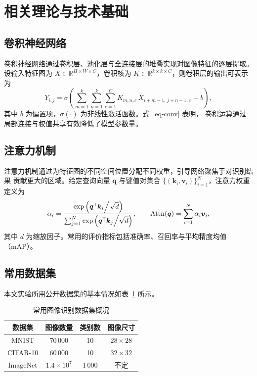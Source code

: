 \section{相关理论与技术基础}

\subsection{卷积神经网络}

\quad 卷积神经网络通过卷积层、池化层与全连接层的堆叠实现对图像特征的逐层提取。
设输入特征图为 $X \in \mathbb{R}^{H \times W \times C}$，卷积核为
$K \in \mathbb{R}^{k \times k \times C}$，则卷积层的输出可表示为
\begin{equation}
  Y_{i,j} = \sigma\left( \sum_{m=1}^{k} \sum_{n=1}^{k} \sum_{c=1}^{C}
    K_{m,n,c} \, X_{i+m-1,\,j+n-1,\,c} + b \right),
  \label{eq-conv}
\end{equation}
其中 $b$ 为偏置项，$\sigma(\cdot)$ 为非线性激活函数。式~\eqref{eq-conv} 表明，
卷积运算通过局部连接与权值共享有效降低了模型参数量。

\subsection{注意力机制}

\quad 注意力机制通过为特征图的不同空间位置分配不同权重，引导网络聚焦于对识别结果
贡献更大的区域。给定查询向量 $\boldsymbol{q}$ 与键值对集合
$\{(\boldsymbol{k}_i, \boldsymbol{v}_i)\}_{i=1}^{N}$，注意力权重定义为
\begin{equation}
  \alpha_i = \frac{\exp\left( \boldsymbol{q}^{\mathsf{T}} \boldsymbol{k}_i
    \middle/ \sqrt{d} \right)}
    {\sum_{j=1}^{N} \exp\left( \boldsymbol{q}^{\mathsf{T}} \boldsymbol{k}_j
    \middle/ \sqrt{d} \right)},
  \qquad
  \mathrm{Attn}(\boldsymbol{q}) = \sum_{i=1}^{N} \alpha_i \boldsymbol{v}_i,
\end{equation}
其中 $d$ 为缩放因子。常用的评价指标包括准确率、召回率与平均精度均值（mAP）。

\subsection{常用数据集}

\quad 本文实验所用公开数据集的基本情况如表~\ref{tab-datasets} 所示。

\begin{table}[htbp]
  \centering
  \caption{常用图像识别数据集概况}
  \label{tab-datasets}
  \begin{tabular}{cccc}
    \toprule
    数据集 & 图像数量 & 类别数 & 图像尺寸 \\
    \midrule
    MNIST     & 70\,000  & 10  & $28 \times 28$ \\
    CIFAR-10  & 60\,000  & 10  & $32 \times 32$ \\
    ImageNet  & $1.4 \times 10^{7}$ & 1\,000 & 不定 \\
    \bottomrule
  \end{tabular}
\end{table}
